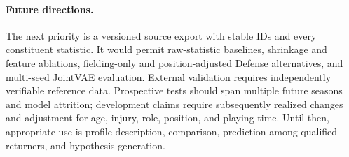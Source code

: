\documentclass[10pt,twocolumn,letterpaper]{article}
\begin{document}
\paragraph{Future directions.}
The next priority is a versioned source export with stable IDs and every constituent statistic. It would permit raw-statistic baselines, shrinkage and feature ablations, fielding-only and position-adjusted Defense alternatives, and multi-seed JointVAE evaluation. External validation requires independently verifiable reference data. Prospective tests should span multiple future seasons and model attrition; development claims require subsequently realized changes and adjustment for age, injury, role, position, and playing time. Until then, appropriate use is profile description, comparison, prediction among qualified returners, and hypothesis generation.
\end{document}
